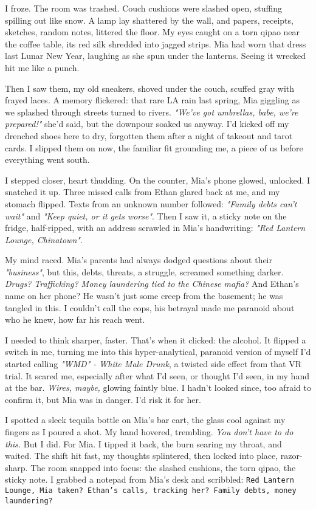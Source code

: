 \documentclass[12pt,oneside]{book} %
\newcommand{\note}[1]{\texttt{#1}}
\begin{document}
I froze. The room was trashed. Couch cushions were slashed open, stuffing spilling out like snow. A lamp lay shattered by the wall, and papers, receipts, sketches, random notes, littered the floor. My eyes caught on a torn qipao near the coffee table, its red silk shredded into jagged strips. Mia had worn that dress last Lunar New Year, laughing as she spun under the lanterns. Seeing it wrecked hit me like a punch.

Then I saw them, my old sneakers, shoved under the couch, scuffed gray with frayed laces. A memory flickered: that rare LA rain last spring, Mia giggling as we splashed through streets turned to rivers. \textit{"We’ve got umbrellas, babe, we’re prepared!"} she’d said, but the downpour soaked us anyway. I’d kicked off my drenched shoes here to dry, forgotten them after a night of takeout and tarot cards. I slipped them on now, the familiar fit grounding me, a piece of us before everything went south.

I stepped closer, heart thudding. On the counter, Mia’s phone glowed, unlocked. I snatched it up. Three missed calls from Ethan glared back at me, and my stomach flipped. Texts from an unknown number followed: \textit{"Family debts can’t wait"} and \textit{"Keep quiet, or it gets worse"}. Then I saw it, a sticky note on the fridge, half-ripped, with an address scrawled in Mia’s handwriting: \textit{"Red Lantern Lounge, Chinatown"}.

My mind raced. Mia’s parents had always dodged questions about their \textit{"business"}, but this, debts, threats, a struggle, screamed something darker. \textit{Drugs? Trafficking? Money laundering tied to the Chinese mafia?} And Ethan’s name on her phone? He wasn’t just some creep from the basement; he was tangled in this. I couldn’t call the cops, his betrayal made me paranoid about who he knew, how far his reach went.

I needed to think sharper, faster. That’s when it clicked: the alcohol. It flipped a switch in me, turning me into this hyper-analytical, paranoid version of myself I’d started calling \textit{"WMD" - White Male Drunk}, a twisted side effect from that VR trial. It scared me, especially after what I’d seen, or thought I’d seen, in my hand at the bar. \textit{Wires, maybe,} glowing faintly blue. I hadn’t looked since, too afraid to confirm it, but Mia was in danger. I’d risk it for her.

I spotted a sleek tequila bottle on Mia’s bar cart, the glass cool against my fingers as I poured a shot. My hand hovered, trembling. \textit{You don’t have to do this.} But I did. For Mia. I tipped it back, the burn searing my throat, and waited. The shift hit fast, my thoughts splintered, then locked into place, razor-sharp. The room snapped into focus: the slashed cushions, the torn qipao, the sticky note. I grabbed a notepad from Mia’s desk and scribbled: \note{Red Lantern Lounge, Mia taken? Ethan’s calls, tracking her? Family debts, money laundering?}
\end{document}
